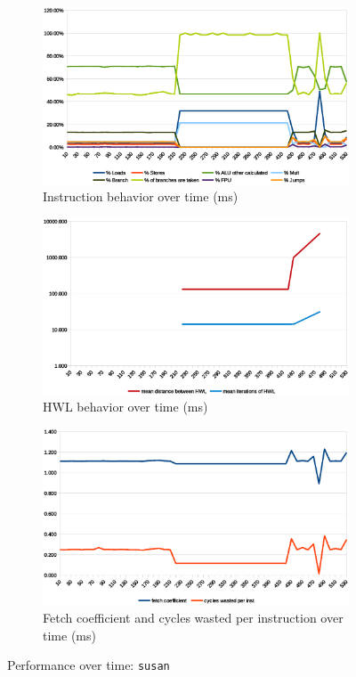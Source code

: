 \documentclass[../bachelor_paper.tex]{subfiles}
\begin{document}
\begin{figure}
    \begin{subfigure}{0.45\textwidth}
        \includegraphics[width=\textwidth]{img/graph/mibench/susan_inst.eps}
        \caption{Instruction behavior over time (ms)}
    \end{subfigure}
    \begin{subfigure}{0.45\textwidth}
        \includegraphics[width=\textwidth]{img/graph/mibench/susan_hwl.eps}
        \caption{\ac{HWL} behavior over time (ms)}
    \end{subfigure}
    \begin{subfigure}{0.45\textwidth}
        \includegraphics[width=\textwidth]{img/graph/mibench/susan_fetch_waste.eps}
        \caption{Fetch coefficient and cycles wasted per instruction over time (ms)}
    \end{subfigure}
    \caption{Performance over time: \texttt{susan}}
\end{figure}
\end{document}
